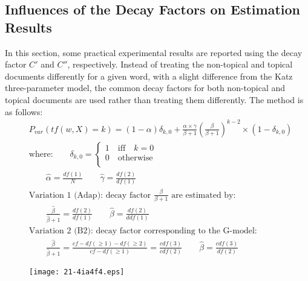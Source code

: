 \documentclass[english]{jnlp_1.4_rep}
\begin{document}
\subsection{Influences of the Decay Factors on Estimation Results}

In this section, some practical experimental results are reported using the decay factor $C'$ and
$C''$, respectively. Instead of treating the non-topical and topical documents differently for a
given word, with a slight difference from the Katz three-parameter model, the common decay factors
for both non-topical and topical documents are used rather than treating them differently. The
method is as follows:
{\allowdisplaybreaks
\begin{align*}
 & P_{\mathit{var}}(\mathit{tf}(w,X)=k) = (1 - \alpha)\delta_{k,0} + \frac{\alpha \times\gamma }{\beta + 1}
	\left(\frac{\beta}{\beta + 1}\right)^{k -2}\times(1-\delta_{k,0}) \\
 & \mbox{where:} \qquad
	 \delta _{k,0}= \left\{\begin{array}{l}
			1 \quad \mbox{iff} \quad k = 0 \\
			0 \quad \mbox{otherwise} \\
		\end{array}\right. \\
 &\qquad \hat{\alpha}  = \frac{\mathit{df}(1)}{N} \qquad \hat{\gamma}  = \frac{\mathit{df}(2)}{\mathit{df}(1)} \\
 & \mbox{Variation 1 (Adap):  decay factor $\frac{\beta}{\beta+1}$ are estimated by:} \\
 & \qquad \frac{\hat{\beta}}{\hat{\beta}+1}  = \frac{\mathit{df}(2)}{\mathit{df}(1)} \qquad \hat{\beta} = \frac{\mathit{df}(2)}{\mathit{ddf}(1)} \\
 & \mbox{Variation 2 (B2): decay factor corresponding to the G-model: } \\
 & \qquad \frac{\hat{\beta}}{\hat{\beta}+1}  = \frac{\mathit{cf}-\mathit{df}(\ge 1)-\mathit{df}(\ge 2)}{\mathit{cf}-\mathit{df}(\ge 1)}
	=\frac{\mathit{cdf}(3)}{\mathit{cdf}(2)} 
	\qquad \hat{\beta} = \frac{\mathit{cdf}(3)}{\mathit{df}(2)}
\end{align*}
}

\begin{figure}[b]
\begin{center}
\texttt{[image: 21-4ia4f4.eps]}
\end{center}
\end{figure}
\end{document}
